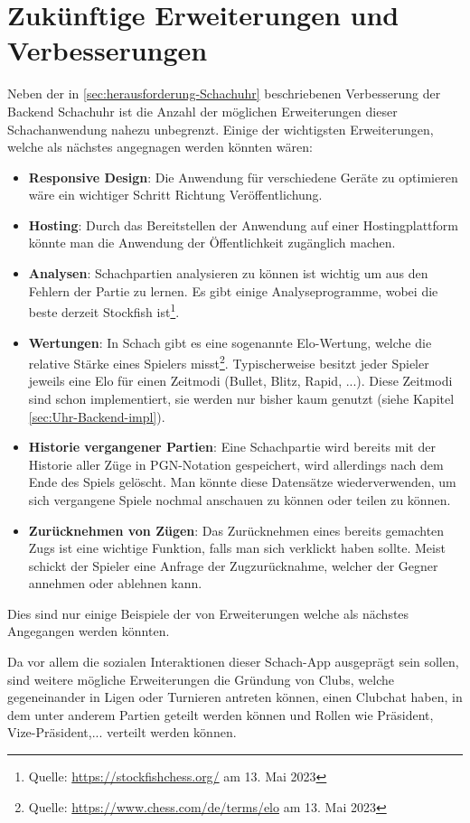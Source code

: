 \section{Zukünftige Erweiterungen und Verbesserungen}
Neben der in \ref{sec:herausforderung-Schachuhr} beschriebenen Verbesserung der Backend Schachuhr ist die Anzahl der möglichen Erweiterungen dieser Schachanwendung nahezu unbegrenzt. Einige der wichtigsten Erweiterungen, welche als nächstes angegnagen werden könnten wären:
\begin{itemize}
\item \textbf{Responsive Design}: Die Anwendung für verschiedene Geräte zu optimieren wäre ein wichtiger Schritt Richtung Veröffentlichung.
\item \textbf{Hosting}: Durch das Bereitstellen der Anwendung auf einer Hostingplattform könnte man die Anwendung der Öffentlichkeit zugänglich machen.
\item \textbf{Analysen}: Schachpartien analysieren zu können ist wichtig um aus den Fehlern der Partie zu lernen. Es gibt einige Analyseprogramme, wobei die beste derzeit Stockfish ist\footnote{Quelle: \url{https://stockfishchess.org/} am 13. Mai 2023}.
\item \textbf{Wertungen}: In Schach gibt es eine sogenannte Elo-Wertung, welche die relative Stärke eines Spielers misst\footnote{Quelle: \url{https://www.chess.com/de/terms/elo} am 13. Mai 2023}. Typischerweise besitzt jeder Spieler jeweils eine Elo für einen Zeitmodi (Bullet, Blitz, Rapid, ...). Diese Zeitmodi sind schon implementiert, sie werden nur bisher kaum genutzt (siehe Kapitel \ref{sec:Uhr-Backend-impl}).
\item \textbf{Historie vergangener Partien}: Eine Schachpartie wird bereits mit der Historie aller Züge in PGN-Notation gespeichert, wird allerdings nach dem Ende des Spiels gelöscht. Man könnte diese Datensätze wiederverwenden, um sich vergangene Spiele nochmal anschauen zu können oder teilen zu können.
\item \textbf{Zurücknehmen von Zügen}: Das Zurücknehmen eines bereits gemachten Zugs ist eine wichtige Funktion, falls man sich verklickt haben sollte. Meist schickt der Spieler eine Anfrage der Zugzurücknahme, welcher der Gegner annehmen oder ablehnen kann.
\end{itemize}

Dies sind nur einige Beispiele der von Erweiterungen welche als nächstes Angegangen werden könnten.

Da vor allem die sozialen Interaktionen dieser Schach-App ausgeprägt sein sollen, sind weitere mögliche Erweiterungen die Gründung von Clubs, welche gegeneinander in Ligen oder Turnieren antreten können, einen Clubchat haben, in dem unter anderem Partien geteilt werden können und Rollen wie Präsident, Vize-Präsident,... verteilt werden können.
 
